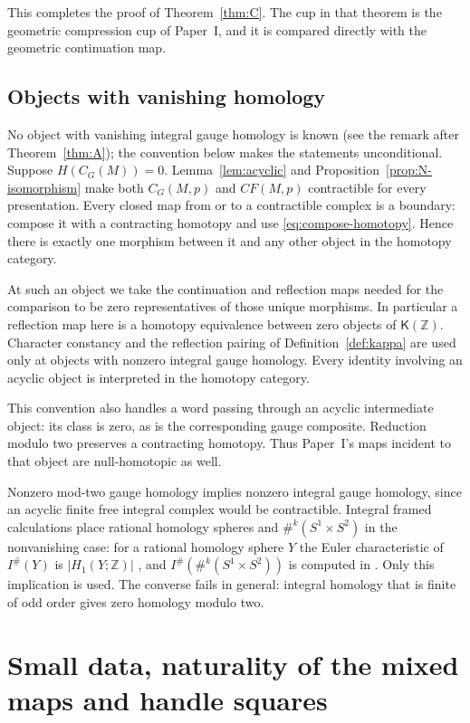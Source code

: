 \documentclass[11pt]{amsart}
\theoremstyle{definition}
\theoremstyle{remark}
\theoremstyle{plain}
\numberwithin{equation}{section}
\newcommand{\ZZ}{\mathbb Z}
\newcommand{\cK}{\mathsf K}
\newcommand{\CF}{\mathit{CF}}
\begin{document}
This completes the proof of Theorem~\ref{thm:C}.
The cup in that theorem is the geometric
compression cup of Paper~I, and it is
compared directly with the geometric
continuation map.

\subsection{Objects with vanishing homology}\label{subsec:zero}
No object with vanishing integral gauge homology is known (see the remark after
Theorem~\ref{thm:A}); the convention below makes the statements unconditional.
Suppose $H(C_G(M))=0$. Lemma~\ref{lem:acyclic}
and Proposition~\ref{prop:N-isomorphism}
make both $C_G(M,p)$ and $\CF(M,p)$
contractible for every presentation.
Every closed map from or to a
contractible complex is a boundary:
compose it with a contracting
homotopy and use
\eqref{eq:compose-homotopy}. Hence
there is exactly one morphism
between it and any other object
in the homotopy category.

At such an object we take the
continuation and reflection maps
needed for the comparison to be
zero representatives of those
unique morphisms. In particular
a reflection map here is a
homotopy equivalence between zero
objects of $\cK(\ZZ)$. Character constancy
and the reflection pairing of
Definition~\ref{def:kappa} are used only at objects with
nonzero integral gauge homology. Every
identity involving an acyclic object is
interpreted in the homotopy category.

This convention also handles a
word passing through an acyclic
intermediate object: its class is
zero, as is the corresponding
gauge composite. Reduction modulo
two preserves a contracting
homotopy. Thus Paper~I's maps
incident to that object are
null-homotopic as well.

Nonzero mod-two gauge homology
implies nonzero integral gauge
homology, since an acyclic finite
free integral complex would be
contractible. Integral framed
calculations place rational homology
spheres and $\#^k(S^1\times S^2)$ in
the nonvanishing case: for a rational
homology sphere $Y$ the Euler
characteristic of $I^\#(Y)$ is
$|H_1(Y;\ZZ)|$
\cite[Corollary~1.4]{Scaduto}, and
$I^\#(\#^k(S^1\times S^2))$ is computed in
\cite[Section~7.8]{Scaduto}.
Only this implication is used. The
converse fails in general: integral
homology that is finite of odd order
gives zero homology modulo two.

\section{Small data, naturality of the mixed maps and handle squares}
\label{sec:choices}
\end{document}
